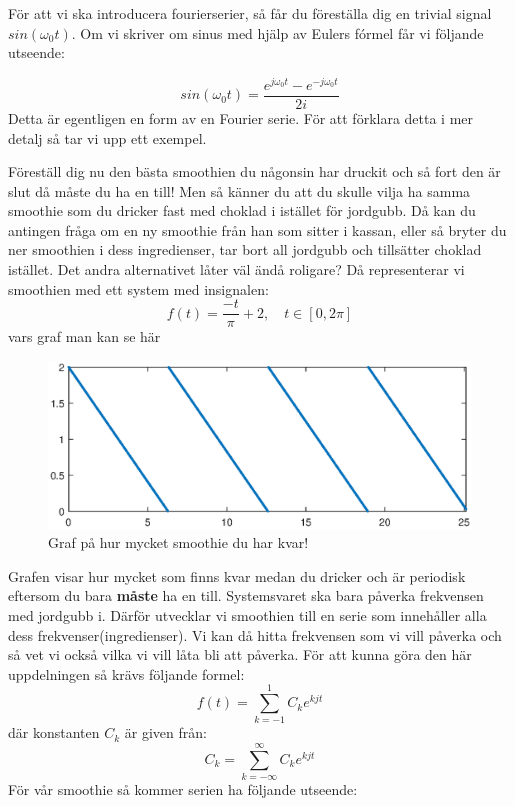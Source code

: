 \documentclass{article}
\begin{document}
För att vi ska introducera fourierserier, så får du föreställa dig en trivial signal $sin(\omega_0 t)$. Om vi skriver om sinus med hjälp av Eulers fórmel får vi följande utseende:

\[sin(\omega_0 t) = \frac{e^{j \omega_0 t}  - e^{-j \omega_0 t}}{2i}\]
Detta är egentligen en form av en Fourier serie. För att förklara detta i mer detalj så tar vi upp ett exempel.

Föreställ dig nu den bästa smoothien du någonsin har druckit och så fort den är slut då måste du ha en till! Men så känner du att du skulle vilja ha samma smoothie som du dricker fast med choklad i istället för jordgubb. Då kan du antingen fråga om en ny smoothie från han som sitter i kassan, eller så bryter du ner smoothien i dess ingredienser, tar bort all jordgubb och tillsätter choklad istället. Det andra alternativet låter väl ändå roligare? 
Då representerar vi smoothien med ett system med insignalen:
\[ f(t) = \frac{-t}{\pi} + 2, \quad t \in [0,2 \pi] \]
vars graf man kan se här %
\begin{figure}[ht]
\centerline{\includegraphics[scale=0.55]{smoothie.eps}}
\caption{Graf på hur mycket smoothie du har kvar!}
\label{}
\end{figure}
Grafen visar hur mycket som finns kvar medan du dricker och är periodisk eftersom du bara \textbf{måste} ha en till. Systemsvaret ska bara påverka frekvensen med jordgubb i. Därför utvecklar vi smoothien till en serie som innehåller alla dess frekvenser(ingredienser). Vi kan då hitta frekvensen som vi vill påverka och så vet vi också vilka vi vill låta bli att påverka. För att kunna göra den här uppdelningen så krävs följande formel:
\[ f(t) = \sum_{k=-1}^1 C_k e^{k j t} \]
där konstanten $C_k$ är given från:
\[C_k = \sum_{k=-\infty}^{\infty} C_k e^{k j t}\] %
För vår smoothie så kommer serien ha följande utseende:
\end{document}
